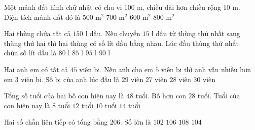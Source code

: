 \begin{ex} %
Một mảnh đất hình chữ nhật có chu vi $100\text{ m}$, chiều dài hơn chiều rộng $10\text{ m}$. Diện tích mảnh đất đó là
\choice
{$500\text{ m}^2$}
{$700\text{ m}^2$}
{\True $600\text{ m}^2$}
{$800\text{ m}^2$}
\end{ex}

\begin{ex} %
Hai thùng chứa tất cả $150\text{ l}$ dầu. Nếu chuyển $15\text{ l}$ dầu từ thùng thứ nhất sang thùng thứ hai thì hai thùng có số lít dầu bằng nhau. Lúc đầu thùng thứ nhất chứa số lít dầu là
\choice
{$80\text{ l}$}
{$85\text{ l}$}
{$95\text{ l}$}
{\True $90\text{ l}$}
\end{ex}

\begin{ex} %
Hai anh em có tất cả $45$ viên bi. Nếu anh cho em $5$ viên bi thì anh vẫn nhiều hơn em $3$ viên bi. Số bi của anh lúc đầu là
\choice
{\True $29$ viên}
{$27$ viên}
{$28$ viên}
{$30$ viên}
\end{ex}

\begin{ex} %
Tổng số tuổi của hai bố con hiện nay là $48$ tuổi. Bố hơn con $28$ tuổi. Tuổi của con hiện nay là
\choice
{$8$ tuổi}
{$12$ tuổi}
{\True $10$ tuổi}
{$14$ tuổi}
\end{ex}

\begin{ex} %
Hai số chẵn liên tiếp có tổng bằng $206$. Số lớn là
\choice
{$102$}
{$106$}
{$108$}
{\True $104$}
\end{ex}

